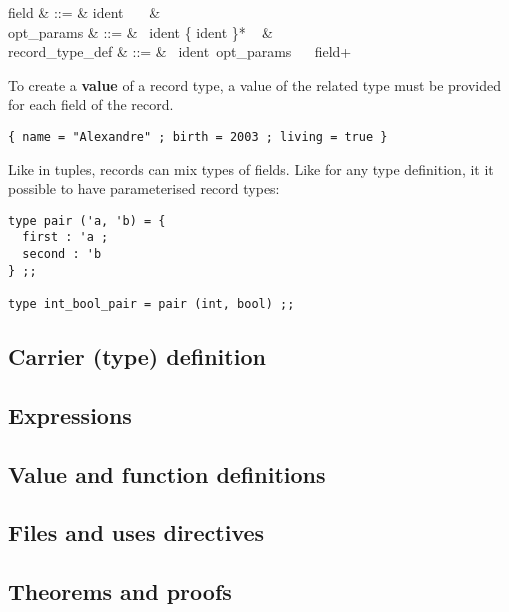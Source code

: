 \vspace{0.2cm}
\begin{syntax}
field & ::= & ident\ \terminal{:}\ \tau\ \terminal{;} & \\
opt\_params & ::= & \epsilon
    \mid \terminal{(}\ ident \{\terminal{,} ident \}*
    \ \terminal{)} & \\
record\_type\_def & ::= &
    \ ident\ opt\_params\  \terminal{=}
    \ \terminal{\{} field+ \terminal{\}}
\end{syntax}
\vspace{0.2cm}

To create a {\bf value} of a record type, a value of the related
type must be provided for each field of the record.
{\scriptsize
\begin{lstlisting}
{ name = "Alexandre" ; birth = 2003 ; living = true }
\end{lstlisting}
}
Like in tuples, records can mix types of fields. Like for any type
definition, it it possible to have parameterised record types:
{\scriptsize
\begin{lstlisting}
type pair ('a, 'b) = {
  first : 'a ;
  second : 'b
} ;;

type int_bool_pair = pair (int, bool) ;;
\end{lstlisting}
}


\subsection{Carrier (type) definition}

\subsection{Expressions}

\subsection{Value and function definitions}

\subsection{Files and uses directives}

\subsection{Theorems and proofs}

